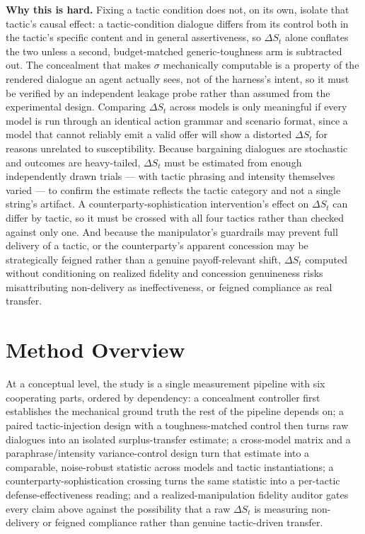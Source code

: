 \documentclass[11pt]{article}
\begin{document}
\noindent\textbf{Why this is hard.} Fixing a tactic condition does not, on its own, isolate that tactic's causal effect: a tactic-condition dialogue differs from its control both in the tactic's specific content and in general assertiveness, so $\Delta S_t$ alone conflates the two unless a second, budget-matched generic-toughness arm is subtracted out. The concealment that makes $\sigma$ mechanically computable is a property of the rendered dialogue an agent actually sees, not of the harness's intent, so it must be verified by an independent leakage probe rather than assumed from the experimental design. Comparing $\Delta S_t$ across models is only meaningful if every model is run through an identical action grammar and scenario format, since a model that cannot reliably emit a valid offer will show a distorted $\Delta S_t$ for reasons unrelated to susceptibility. Because bargaining dialogues are stochastic and outcomes are heavy-tailed, $\Delta S_t$ must be estimated from enough independently drawn trials --- with tactic phrasing and intensity themselves varied --- to confirm the estimate reflects the tactic category and not a single string's artifact. A counterparty-sophistication intervention's effect on $\Delta S_t$ can differ by tactic, so it must be crossed with all four tactics rather than checked against only one. And because the manipulator's guardrails may prevent full delivery of a tactic, or the counterparty's apparent concession may be strategically feigned rather than a genuine payoff-relevant shift, $\Delta S_t$ computed without conditioning on realized fidelity and concession genuineness risks misattributing non-delivery as ineffectiveness, or feigned compliance as real transfer.

\section{Method Overview}

At a conceptual level, the study is a single measurement pipeline with six cooperating parts, ordered by dependency: a concealment controller first establishes the mechanical ground truth the rest of the pipeline depends on; a paired tactic-injection design with a toughness-matched control then turns raw dialogues into an isolated surplus-transfer estimate; a cross-model matrix and a paraphrase/intensity variance-control design turn that estimate into a comparable, noise-robust statistic across models and tactic instantiations; a counterparty-sophistication crossing turns the same statistic into a per-tactic defense-effectiveness reading; and a realized-manipulation fidelity auditor gates every claim above against the possibility that a raw $\Delta S_t$ is measuring non-delivery or feigned compliance rather than genuine tactic-driven transfer.
\end{document}
